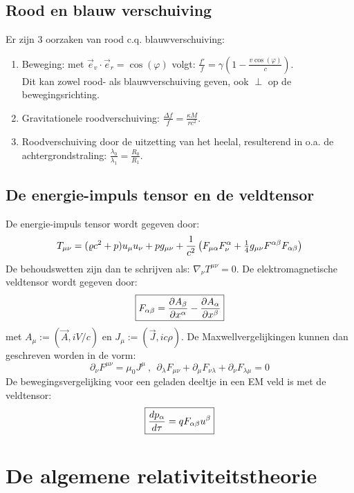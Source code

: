 \documentclass[twoside]{report}
\begin{document}
\subsection{Rood en blauw verschuiving}
Er zijn 3 oorzaken van rood c.q. blauwverschuiving:
\begin{enumerate}
\item Beweging: met $\vec{e}_v\cdot\vec{e}_r=\cos(\varphi)$ volgt:
      $\displaystyle \frac{f'}{f}=\gamma\left(1-\frac{v\cos(\varphi)}{c}\right)$.\\
      Dit kan zowel rood- als blauwverschuiving geven, ook $\perp$ op de
      bewegingsrichting.
\item Gravitationele roodverschuiving: $\displaystyle\frac{\Delta f}{f}=\frac{\kappa M}{rc^2}$.
\item Roodverschuiving door de uitzetting van het heelal, resulterend in o.a.
      de achtergrondstraling: $\displaystyle\frac{\lambda_0}{\lambda_1}=\frac{R_0}{R_1}$.
\end{enumerate}

\subsection{De energie-impuls tensor en de veldtensor}
De energie-impuls tensor wordt gegeven door:
\[
T_{\mu\nu}=(\varrho c^2+p)u_\mu u_\nu+pg_{\mu\nu}+\frac{1}{c^2}
\left(F_{\mu\alpha}F^\alpha_\nu+\mbox{$\frac{1}{4}$} g_{\mu\nu}F^{\alpha\beta}F_{\alpha\beta}\right)
\]
De behoudswetten zijn dan te schrijven als: $\nabla_\nu T^{\mu\nu}=0$. De
elektromagnetische veldtensor wordt gegeven door:
\[
\mbox{\fbox{$\displaystyle F_{\alpha\beta}=\frac{\partial A_\beta}{\partial x^\alpha}-\frac{\partial A_\alpha}{\partial x^\beta}$}}
\]
met $A_\mu:=(\vec{A},iV/c)$ en $J_\mu:=(\vec{J},ic\rho)$. De
Maxwellvergelijkingen kunnen dan geschreven worden in de vorm:
\[
\partial_\nu F^{\mu\nu}=\mu_0J^\mu~,~~
\partial_\lambda F_{\mu\nu}+\partial_\mu F_{\nu\lambda}+\partial_\nu F_{\lambda\mu}=0
\]
De bewegingsvergelijking voor een geladen deeltje in een EM veld is met de
veldtensor:
\[
\mbox{\fbox{$\displaystyle\frac{dp_\alpha}{d\tau}=qF_{\alpha\beta}u^\beta$}}
\]

\section{De algemene relativiteitstheorie}
\end{document}
